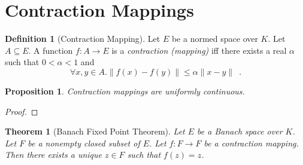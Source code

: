 \documentclass{book}
\let\qed\relax
\newtheorem{prop}[ax]{Proposition}
\newtheorem{thm}[ax]{Theorem}
\theoremstyle{definition}
\newtheorem{df}[ax]{Definition}
\begin{document}
\section{Contraction Mappings}

\begin{df}[Contraction Mapping]
Let $E$ be a normed space over $K$. Let $A \subseteq E$. A function $f : A \rightarrow E$ is a \emph{contraction (mapping)} iff there exists a real $\alpha$ such that $0 < \alpha < 1$ and
\[ \forall x,y \in A. \| f(x) - f(y) \| \leq \alpha \|x-y\| \enspace . \]
\end{df}

\begin{prop}
\label{prop:contcont}
Contraction mappings are uniformly continuous.
\end{prop}

\begin{proof}
\pf
{}
\qed
\end{proof}

\begin{thm}[Banach Fixed Point Theorem]
Let $E$ be a Banach space over $K$. Let $F$ be a nonempty closed subset of $E$. Let $f : F \rightarrow F$ be a contraction mapping. Then there exists a unique $z \in F$ such that $f(z) = z$.
\end{thm}
\end{document}
